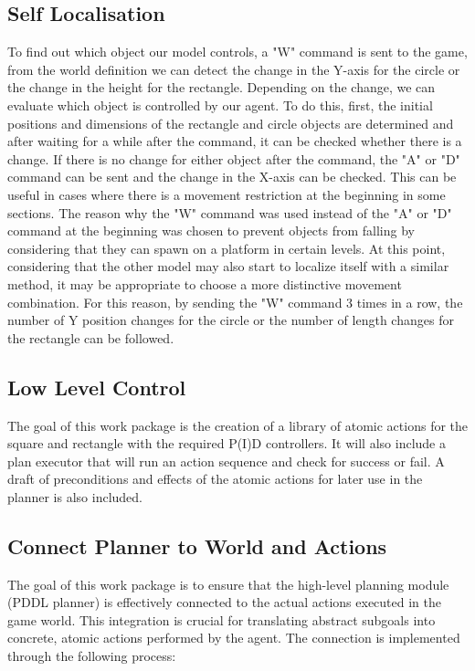 \documentclass{article}
\begin{document}
\subsection{Self Localisation}
To find out which object our model controls, a "W" command is sent to the game, from the world definition we can detect the change in the Y-axis for the circle or the change in the height for the rectangle. Depending on the change, we can evaluate which object is controlled by our agent. To do this, first, the initial positions and dimensions of the rectangle and circle objects are determined and after waiting for a while after the command, it can be checked whether there is a change. If there is no change for either object after the command, the "A" or "D" command can be sent and the change in the X-axis can be checked. This can be useful in cases where there is a movement restriction at the beginning in some sections. The reason why the "W" command was used instead of the "A" or "D" command at the beginning was chosen to prevent objects from falling by considering that they can spawn on a platform in certain levels. At this point, considering that the other model may also start to localize itself with a similar method, it may be appropriate to choose a more distinctive movement combination. For this reason, by sending the "W" command 3 times in a row, the number of Y position changes for the circle or the number of length changes for the rectangle can be followed.

\subsection{Low Level Control}
The goal of this work package is the creation of a library of atomic actions for the square and rectangle with the required P(I)D controllers. It will also include a plan executor that will run an action sequence and check for success or fail.
A draft of preconditions and effects of the atomic actions for later use in the planner is also included.

\subsection{Connect Planner to World and Actions}

The goal of this work package is to ensure that the high-level planning module (PDDL planner) is effectively connected to the actual actions executed in the game world. This integration is crucial for translating abstract subgoals into concrete, atomic actions performed by the agent. The connection is implemented through the following process:
\end{document}
